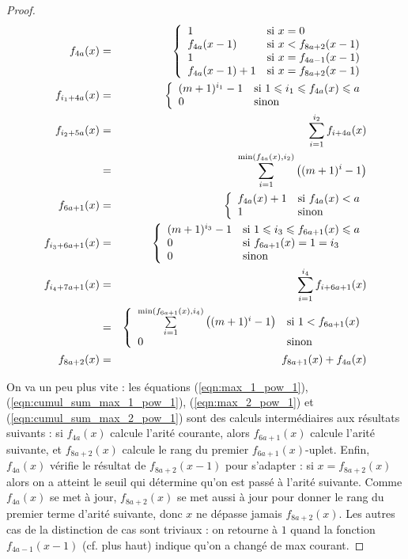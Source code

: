 \documentclass{report}
\begin{document}
\begin{proof}
			\begin{eqnarray}
				f_{4a}(x) & = & \left\lbrace \begin{array}{ll} 
									1 & \text{si $x = 0$} \\
									f_{4a}(x-1) & \text{si $x < f_{8a+2}(x-1)$}\\
									1 & \text{si $x = f_{4a-1}(x-1)$} \\
									f_{4a}(x-1) + 1 & \text{si $x = f_{8a+2}(x-1)$} 
									 \end{array} \right. \label{eqn:f_4a_arite_courante} \\
				f_{i_1+4a}(x) & = & \left\lbrace \begin{array}{ll} 
										(m+1)^{i_1} - 1 & \text{si $1 \leqslant i_1 \leqslant f_{4a}(x) \leqslant a$} \\
										0 & \text{sinon}
										 \end{array} \right. \label{eqn:max_1_pow_1}\\
				f_{i_2+5a}(x) & = & \sum_{i=1}^{i_2} f_{i+4a}(x)\label{eqn:cumul_sum_max_1_pow_1} \\
					& = & \sum_{i=1}^{\min\left(f_{4a}(x), i_2\right)} \left((m+1)^{i} - 1\right) \nonumber\\
				f_{6a +1}(x) & = & \left\lbrace \begin{array}{ll} 
										f_{4a}(x)+1 & \text{si $f_{4a}(x) < a$} \\
										1 	& \text{sinon}
										 \end{array} \right. \label{eqn:f_4a_arite_suivante}\\
				f_{i_3+6a+1}(x) & = & \left\lbrace \begin{array}{ll} 
										(m+1)^{i_3} - 1 & \text{si $1 \leqslant i_3 \leqslant f_{6a +1}(x) \leqslant a$} \\
										0 & \text{si $f_{6a +1}(x)=1 = i_3$} \\
										0 & \text{sinon} 
										 \end{array} \right. \label{eqn:max_2_pow_1}\\
				f_{i_4+7a+1}(x) & = & \sum_{i=1}^{i_4} f_{i+6a+1}(x)\label{eqn:cumul_sum_max_2_pow_1} \\
					& = & \left\lbrace \begin{array}{ll} 
								\sum\limits_{i=1}^{\min\left(f_{6a+1}(x), i_4\right)} \left((m+1)^{i} - 1\right) & \text{si $1 < f_{6a +1}(x)$} \\
								0 & \text{sinon}
								 \end{array} \right. \nonumber \\
				f_{8a+2}(x) & = & f_{8a+1}(x) + f_{4a}(x) \label{eqn:rang_arite_suivante}
			\end{eqnarray}
			
			
			On va un peu plus vite : les équations (\ref{eqn:max_1_pow_1}), (\ref{eqn:cumul_sum_max_1_pow_1}), (\ref{eqn:max_2_pow_1}) et (\ref{eqn:cumul_sum_max_2_pow_1}) sont des calculs intermédiaires aux résultats suivants : si $f_{4a}(x)$ calcule l'arité courante, alors $f_{6a +1}(x)$ calcule l'arité suivante, et $f_{8a+2}(x)$ calcule le rang du premier $f_{6a +1}(x)$-uplet. Enfin, $f_{4a}(x)$ vérifie le résultat de $f_{8a+2}(x-1)$ pour s'adapter : si $x = f_{8a+2}(x)$ alors on a atteint le seuil qui détermine qu'on est passé à l'arité suivante. Comme $f_{4a}(x)$ se met à jour, $f_{8a+2}(x)$ se met aussi à jour pour donner le rang du premier terme d'arité suivante, donc $x$ ne dépasse jamais $f_{8a+2}(x)$. Les autres cas de la distinction de cas sont triviaux : on retourne à $1$ quand la fonction $f_{4a-1}(x-1)$ (cf. plus haut) indique qu'on a changé de max courant.
			

\end{proof}
\end{document}
